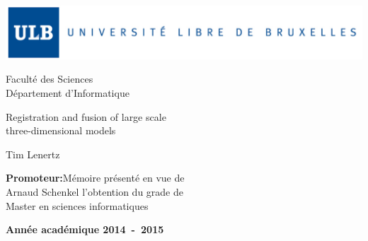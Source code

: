 \frontmatter
\begin{titlepage}
\begin{center}

\sffamily

\includegraphics[width=\textwidth]{fig/ulb.jpg}


Faculté des Sciences \\
Département d'Informatique

\vfill{} \vfill{}

{\Huge
Registration and fusion of large scale \\
\vspace{.3cm}
three-dimensional models
}

\vspace*{.8cm}
{\LARGE Tim Lenertz}


\vfill{} \vfill{}

\begin{flushright}
{\large \textbf{Promoteur:}}\hfill{}{\large Mémoire présenté en vue de}\\
{\large Arnaud Schenkel}     \hfill{}{\large l'obtention du grade de}\\
                             \hfill{}{\large Master en sciences informatiques}\\
\end{flushright}

\vfill{}\vfill{}\enlargethispage{3cm}

\textbf{Année académique 2014~-~2015}
\end{center}

\end{titlepage}
